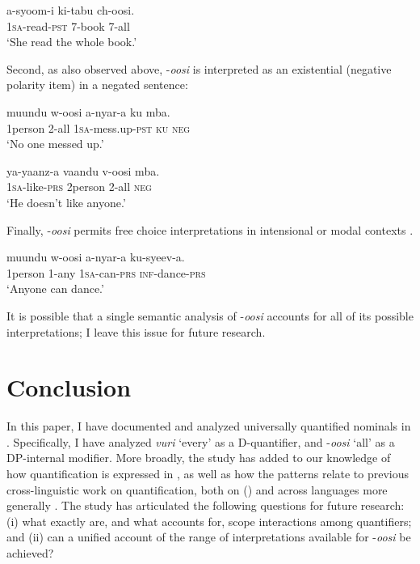 \documentclass[output=paper]{langsci/langscibook}
\begin{document}
\ea\label{ex:landman:}
\gll a-syoom-i  ki-tabu  ch-oosi.\\
     1\textsc{sa}-read-\textsc{pst}    7-book \textsc{7-}all \\
\glt ‘She read the whole book.’
\z

  Second, as also observed above, -\textit{oosi} is interpreted as an existential (negative polarity item) in a negated sentence:  

\ea\label{ex:landman:} 
\gll muundu  w-oosi    a-nyar-a    ku  mba.  \\
     1person  2-all    1\textsc{sa}-mess.up-\textsc{pst}  \textsc{ku}  \textsc{neg}\\
\glt ‘No one messed up.’        
\z

\ea\label{ex:landman:}
\gll ya-yaanz-a  vaandu   v-oosi    mba. \\
     1\textsc{sa}-like-\textsc{prs}  2person     2-all    \textsc{neg}\\
\glt ‘He doesn't like anyone.’
\z

  Finally, -\textit{oosi} permits free choice interpretations in intensional or modal contexts .

\ea\label{ex:landman:33}
\gll muundu  w-oosi    a-nyar-a  ku-syeev-a.\\
     1person  1-any    1\textsc{sa}-can-\textsc{prs}  \textsc{inf-}dance-\textsc{prs} \\
\glt ‘Anyone can dance.’
\z

It is possible that a single semantic analysis of -\textit{oosi} accounts for all of its possible interpretations; I leave this issue for future research. 

\section{Conclusion}\label{sec:landman:5}

In this paper, I have documented and analyzed universally quantified nominals in . Specifically, I have analyzed \textit{vuri} ‘every’ as a D-quantifier, and -\textit{oosi} ‘all’ as a DP-internal modifier. More broadly, the study has added to our knowledge of how quantification is expressed in , as well as how the  patterns relate to previous cross-linguistic work on quantification, both on  (\citealt{ZerbianKrifka2008}) and across languages more generally \citep{Matthewson2013}. The study has articulated the following questions for future research: (i) what exactly are, and what accounts for, scope interactions among  quantifiers; and (ii) can a unified account of the range of interpretations available for -\textit{oosi} be achieved?
\end{document}
